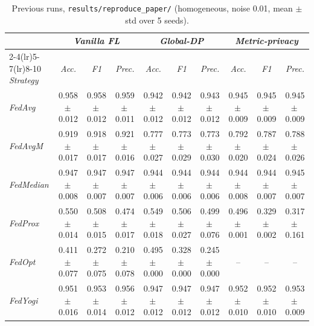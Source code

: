 \documentclass[11pt]{article}
\begin{document}
\clearpage
\begin{table}[h]
\centering
\caption{Previous runs, \texttt{results/reproduce\_paper/} (homogeneous, noise 0.01,
mean $\pm$ std over 5 seeds).}
\begin{tabular}{l ccc ccc ccc}
\toprule
& \multicolumn{3}{c}{\emph{Vanilla FL}} & \multicolumn{3}{c}{\emph{Global-DP}} & \multicolumn{3}{c}{\emph{Metric-privacy}} \\
\cmidrule(lr){2-4}\cmidrule(lr){5-7}\cmidrule(lr){8-10}
\emph{Strategy} & \emph{Acc.} & \emph{F1} & \emph{Prec.} & \emph{Acc.} & \emph{F1} & \emph{Prec.} & \emph{Acc.} & \emph{F1} & \emph{Prec.} \\
\midrule
\emph{FedAvg} & 0.958 {\scriptsize$\pm$\,0.012} & 0.958 {\scriptsize$\pm$\,0.012} & 0.959 {\scriptsize$\pm$\,0.011} & 0.942 {\scriptsize$\pm$\,0.012} & 0.942 {\scriptsize$\pm$\,0.012} & 0.943 {\scriptsize$\pm$\,0.012} & 0.945 {\scriptsize$\pm$\,0.009} & 0.945 {\scriptsize$\pm$\,0.009} & 0.945 {\scriptsize$\pm$\,0.009} \\
\emph{FedAvgM} & 0.919 {\scriptsize$\pm$\,0.017} & 0.918 {\scriptsize$\pm$\,0.017} & 0.921 {\scriptsize$\pm$\,0.016} & 0.777 {\scriptsize$\pm$\,0.027} & 0.773 {\scriptsize$\pm$\,0.029} & 0.773 {\scriptsize$\pm$\,0.030} & 0.792 {\scriptsize$\pm$\,0.020} & 0.787 {\scriptsize$\pm$\,0.024} & 0.788 {\scriptsize$\pm$\,0.026} \\
\emph{FedMedian} & 0.947 {\scriptsize$\pm$\,0.008} & 0.947 {\scriptsize$\pm$\,0.007} & 0.947 {\scriptsize$\pm$\,0.007} & 0.944 {\scriptsize$\pm$\,0.006} & 0.944 {\scriptsize$\pm$\,0.006} & 0.944 {\scriptsize$\pm$\,0.006} & 0.944 {\scriptsize$\pm$\,0.008} & 0.944 {\scriptsize$\pm$\,0.007} & 0.945 {\scriptsize$\pm$\,0.007} \\
\emph{FedProx} & 0.550 {\scriptsize$\pm$\,0.014} & 0.508 {\scriptsize$\pm$\,0.015} & 0.474 {\scriptsize$\pm$\,0.017} & 0.549 {\scriptsize$\pm$\,0.018} & 0.506 {\scriptsize$\pm$\,0.027} & 0.499 {\scriptsize$\pm$\,0.076} & 0.496 {\scriptsize$\pm$\,0.001} & 0.329 {\scriptsize$\pm$\,0.002} & 0.317 {\scriptsize$\pm$\,0.161} \\
\emph{FedOpt} & 0.411 {\scriptsize$\pm$\,0.077} & 0.272 {\scriptsize$\pm$\,0.075} & 0.210 {\scriptsize$\pm$\,0.078} & 0.495 {\scriptsize$\pm$\,0.000} & 0.328 {\scriptsize$\pm$\,0.000} & 0.245 {\scriptsize$\pm$\,0.000} & -- & -- & -- \\
\emph{FedYogi} & 0.951 {\scriptsize$\pm$\,0.016} & 0.953 {\scriptsize$\pm$\,0.014} & 0.956 {\scriptsize$\pm$\,0.012} & 0.947 {\scriptsize$\pm$\,0.012} & 0.947 {\scriptsize$\pm$\,0.012} & 0.947 {\scriptsize$\pm$\,0.012} & 0.952 {\scriptsize$\pm$\,0.010} & 0.952 {\scriptsize$\pm$\,0.010} & 0.953 {\scriptsize$\pm$\,0.009} \\
\bottomrule
\end{tabular}
\end{table}
\end{document}
